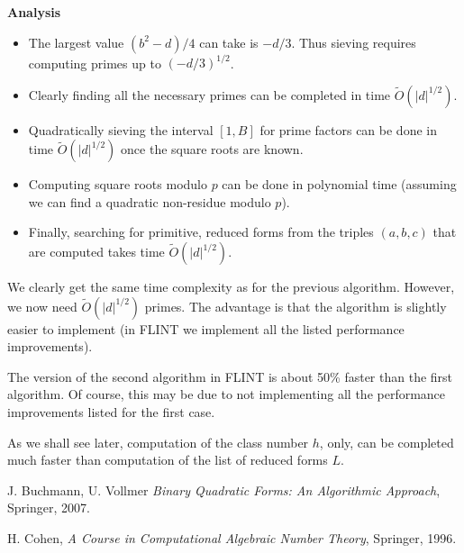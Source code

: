 \documentclass[a4paper,10pt]{amsart}
\begin{document}
\textbf{Analysis}

\begin{itemize}
\item The largest value $(b^2 - d)/4$ can take is $-d/3$. Thus sieving requires computing primes up to $(-d/3)^{1/2}$. 

\item Clearly finding all the necessary primes can be completed in time $\tilde{O}(|d|^{1/2})$.

\item Quadratically sieving the interval $[1, B]$ for prime factors can be done in time $\tilde{O}(|d|^{1/2})$ once the square roots are known. 

\item Computing square roots modulo $p$ can be done in polynomial time (assuming we can find a quadratic non-residue modulo $p$). 

\item Finally, searching for primitive, reduced forms from the triples $(a, b, c)$ that are computed takes time $\tilde{O}(|d|^{1/2})$.
\end{itemize}

We clearly get the same time complexity as for the previous algorithm. However, we now need $\tilde{O}(|d|^{1/2})$ primes. The advantage is that the algorithm is slightly easier to implement (in FLINT we implement all the listed performance improvements).

The version of the second algorithm in FLINT is about 50\% faster than the first algorithm. Of course, this may be due to not implementing all the performance improvements listed for the first case. 

As we shall see later, computation of the class number $h$, only, can be completed much faster than computation of the list of reduced forms $L$. 

\begin{thebibliography}{99}

 J. Buchmann, U. Vollmer \emph{Binary Quadratic Forms: An Algorithmic Approach}, Springer, 2007.

 H. Cohen, \emph{A Course in Computational Algebraic Number Theory}, Springer, 1996.

\end{thebibliography}
\end{document}
